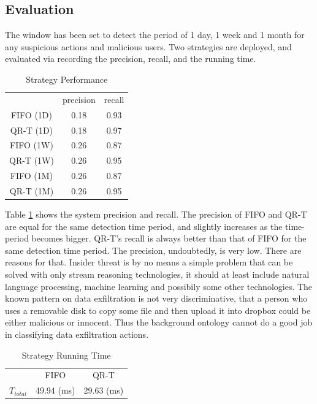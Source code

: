\subsection{Evaluation}
The window has been set to detect the period of 1 day, 1 week and 1 month for any suspicious actions and malicious users. 
Two strategies are deployed, and evaluated via recording the precision, recall, and the running time. 

\begin{table}[!htbp]
	\centering
    \caption{Strategy Performance}
    \label{tab:sp}
    \begin{tabular}{|c||c|c|} \hline
    	& precision & recall \\ \hhline{|=#=|=|}
        FIFO (1D) & 0.18 & 0.93 \\ \hline
        QR-T (1D) & 0.18 & 0.97 \\ \hline
        FIFO (1W) & 0.26 & 0.87 \\ \hline
        QR-T (1W) & 0.26 & 0.95 \\ \hline
        FIFO (1M) & 0.26 & 0.87 \\ \hline
        QR-T (1M) & 0.26 & 0.95 \\ \hline
    \end{tabular}
\end{table}

Table \ref{tab:sp} shows the system precision and recall. 
The precision of FIFO and QR-T are equal for the same detection time period, and slightly increases as the time-period becomes bigger. 
QR-T's recall is always better than that of FIFO for the same detection time period. 
The precision, undoubtedly, is very low. 
There are reasons for that. 
Insider threat is by no means a simple problem that can be solved with only stream reasoning technologies, it should at least include natural language processing, machine learning and possibily some other technologies. 
The known pattern on data exfiltration is not very discriminative, that a person who uses a removable disk to copy some file and then upload it into dropbox could be either malicious or innocent.
Thus the background ontology cannot do a good job in classifying data exfiltration actions.

\begin{table}[!htbp]
	\centering
    \caption{Strategy Running Time}
    \label{tab:srt}
    \begin{tabular}{|c||c|c|} \hline
	    & FIFO & QR-T \\ \hhline{|=#=|=|}
    	$T_{total}$ & 49.94 (ms) & 29.63 (ms) \\ \hline    
    \end{tabular}	
\end{table}

